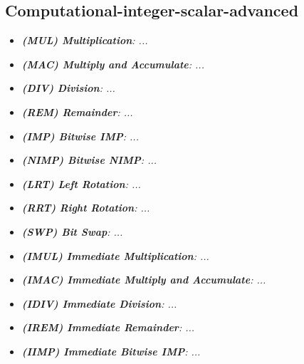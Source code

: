     \subsection{Computational-integer-scalar-advanced}

        \begin{multicols}{2}

            \begin{itemize}

                \item \textit{\textbf{(MUL) Multiplication}: ...}

                \item \textit{\textbf{(MAC) Multiply and Accumulate}: ...}

                \item \textit{\textbf{(DIV) Division}: ...}
                
                \item \textit{\textbf{(REM) Remainder}: ...}

                \item \textit{\textbf{(IMP) Bitwise IMP}: ...}

                \item \textit{\textbf{(NIMP) Bitwise NIMP}: ...}

                \item \textit{\textbf{(LRT) Left Rotation}: ...}
                
                \item \textit{\textbf{(RRT) Right Rotation}: ...}

                \item \textit{\textbf{(SWP) Bit Swap}: ...}

                \item \textit{\textbf{(IMUL) Immediate Multiplication}: ...}

                \item \textit{\textbf{(IMAC) Immediate Multiply and Accumulate}: ...}
                
                \item \textit{\textbf{(IDIV) Immediate Division}: ...}

                \item \textit{\textbf{(IREM) Immediate Remainder}: ...}

                \item \textit{\textbf{(IIMP) Immediate Bitwise IMP}: ...}


\end{itemize}
\end{multicols}
